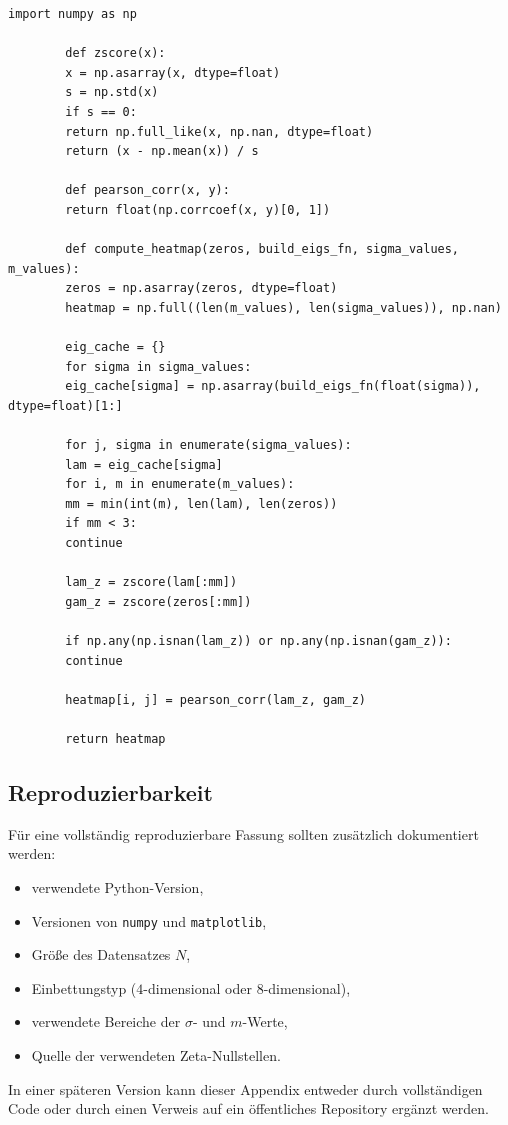 \documentclass[11pt,a4paper,draft]{article}
\begin{document}
	\begin{lstlisting}[caption={Berechnung der Korrelationen im \((\sigma,m)\)-Raum.}]
		import numpy as np
		
		def zscore(x):
		x = np.asarray(x, dtype=float)
		s = np.std(x)
		if s == 0:
		return np.full_like(x, np.nan, dtype=float)
		return (x - np.mean(x)) / s
		
		def pearson_corr(x, y):
		return float(np.corrcoef(x, y)[0, 1])
		
		def compute_heatmap(zeros, build_eigs_fn, sigma_values, m_values):
		zeros = np.asarray(zeros, dtype=float)
		heatmap = np.full((len(m_values), len(sigma_values)), np.nan)
		
		eig_cache = {}
		for sigma in sigma_values:
		eig_cache[sigma] = np.asarray(build_eigs_fn(float(sigma)), dtype=float)[1:]
		
		for j, sigma in enumerate(sigma_values):
		lam = eig_cache[sigma]
		for i, m in enumerate(m_values):
		mm = min(int(m), len(lam), len(zeros))
		if mm < 3:
		continue
		
		lam_z = zscore(lam[:mm])
		gam_z = zscore(zeros[:mm])
		
		if np.any(np.isnan(lam_z)) or np.any(np.isnan(gam_z)):
		continue
		
		heatmap[i, j] = pearson_corr(lam_z, gam_z)
		
		return heatmap
	\end{lstlisting}
	
	\subsection{Reproduzierbarkeit}
	
	Für eine vollständig reproduzierbare Fassung sollten zusätzlich dokumentiert werden:
	\begin{itemize}
		\item verwendete Python-Version,
		\item Versionen von \texttt{numpy} und \texttt{matplotlib},
		\item Größe des Datensatzes \(N\),
		\item Einbettungstyp (\(4\)-dimensional oder \(8\)-dimensional),
		\item verwendete Bereiche der \(\sigma\)- und \(m\)-Werte,
		\item Quelle der verwendeten Zeta-Nullstellen.
	\end{itemize}
	
	In einer späteren Version kann dieser Appendix entweder durch vollständigen Code oder durch einen Verweis auf ein öffentliches Repository ergänzt werden.
	
\end{document}
